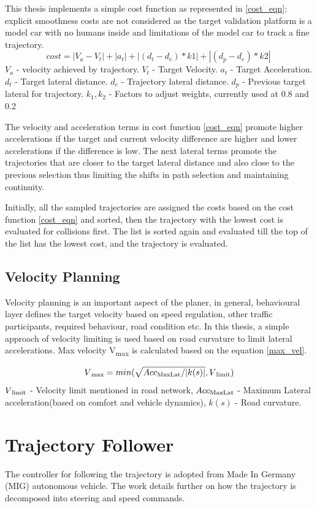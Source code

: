 This thesis implements a simple cost function as represented in \ref{cost_eqn}; explicit smoothness costs are not considered as the target validation platform is a model car with no humans inside and limitations of the model car to track a fine trajectory. 
\begin{equation}
cost = |V_a - V_t| + |a_t| + | (d_t - d_e)*k1 | + | (d_p - d_e)*k2 |\
\label{cost_eqn}
\end{equation}
$V_a$ - velocity achieved by trajectory.
$V_t$ - Target Velocity.
$a_t$ - Target Acceleration.
$d_t$ - Target lateral distance.
$d_e$ - Trajectory lateral distance.
$d_p$ - Previous target lateral for trajectory.
$k_1,k_2$ - Factors to adjust weights, currently used at 0.8 and 0.2

The velocity and acceleration terms in cost function \ref{cost_eqn} promote higher accelerations if the target and current velocity difference are higher and lower accelerations if the difference is low. The next lateral terms promote the trajectories that are closer to the target lateral distance and also close to the previous selection thus limiting the shifts in path selection and maintaining continuity. 

Initially, all the sampled trajectories are assigned the costs based on the cost function \ref{cost_eqn} and sorted, then the trajectory with the lowest cost is evaluated for collisions first. The list is sorted again and evaluated till the top of the list has the lowest cost, and the trajectory is evaluated. 

\subsection{Velocity Planning}
Velocity planning is an important aspect of the planer, in general, behavioural layer defines the target velocity based on speed regulation, other traffic participants, required behaviour, road condition etc. In this thesis, a simple approach of velocity limiting is used based on road curvature to limit lateral accelerations. Max velocity  V\textsubscript{max} is calculated based on the equation \ref{max_vel}. 

\begin{equation}
    V\textsubscript{max} = min(\sqrt{Acc\textsubscript{MaxLat} / |k(s)|} , V\textsubscript{limit})
\label{max_vel}
\end{equation}
$V\textsubscript{limit}$ - Velocity limit mentioned in road network,
$Acc\textsubscript{MaxLat}$ - Maximum Lateral acceleration(based on comfort and vehicle dynamics),
$k(s)$ - Road curvature.

\section{Trajectory Follower} \label{traj_follower}

The controller for following the trajectory is adopted from Made In Germany (MIG) autonomous vehicle. The work \cite{mig_controller} details further on how the trajectory is decomposed into steering and speed commands. 
